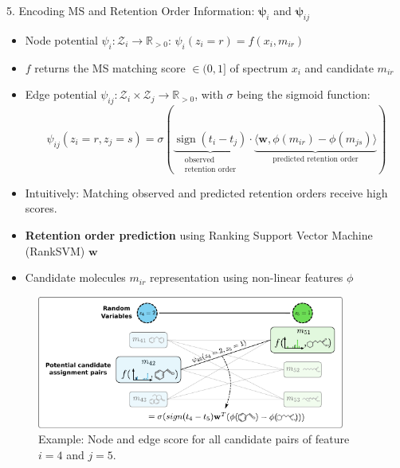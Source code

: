 \documentclass{beamer}
\newcommand{\ms}{MS}
\DeclareMathOperator{\sign}{sign}
\begin{document}
\begin{frame}{}
\begin{columns}[T]
    \begin{block}{{\normalsize 5. Encoding \ms{} and Retention Order Information: $\boldsymbol{\psi}_i$ and $\boldsymbol{\psi}_{ij}$}}
    \begin{itemize}
        \item Node potential $\psi_i:\mathcal{Z}_i\rightarrow\mathbb{R}_{>0}$: $\psi_i(z_i=r)=f(x_i,m_{ir})$
        \item $f$ returns the \ms{} matching score $\in(0,1]$ of spectrum $x_i$ and candidate $m_{ir}$
        \item Edge potential $\psi_{ij}:\mathcal{Z}_i\times\mathcal{Z}_j\rightarrow\mathbb{R}_{>0}$, with $\sigma$ being the sigmoid function:
            \begin{equation}
                \psi_{ij}(z_i=r,z_j=s)=\sigma(\underbrace{\sign(t_i-t_j)}_{\substack{\text{observed}\\ \text{retention order}}}\cdot\underbrace{\langle\mathbf{w},\phi(m_{ir})-\phi(m_{js})\rangle}_{\text{predicted retention order}})
            \end{equation}
        \item Intuitively: Matching observed and predicted retention orders receive high scores.
        \item \textbf{Retention order prediction} using Ranking Support Vector Machine (RankSVM) $\mathbf{w}$ \cite{Bach2018}
        \item Candidate molecules $m_{ir}$ representation using non-linear features $\phi$ 
    \end{itemize}
    \vspace{0.25cm}
    \begin{figure}
        \centering
        \includegraphics[width=0.9\textwidth]{images/node_and_edge_scores.pdf}
        \caption{Example: Node and edge score for all candidate pairs of feature $i=4$ and $j=5$.}
    \end{figure}
    \vspace{-0.75cm}
    \end{block}



\end{columns}
\end{frame}
\end{document}
